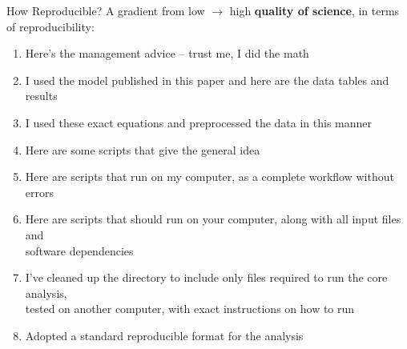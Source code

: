 \documentclass[aspectratio=169]{beamer}
\begin{document}
\begin{frame}{How Reproducible?}\small
  A gradient from low $\rightarrow$ high {\bf quality of science}, in terms of
  reproducibility:\\
  \begin{enumerate}
    \item Here's the management advice -- trust me, I did the math\\[-0.5ex]
    \item I used the model published in this paper and here are the data
    tables and results\\[-0.5ex]
    \item I used these exact equations and preprocessed the data in this
    manner\\[-0.5ex]
    \item Here are some scripts that give the general idea\\[-0.5ex]
    \item Here are scripts that run on my computer, as a complete workflow
    without errors\\[-0.5ex]
    \item Here are scripts that should run on your computer, along with all
    input files and\\
    software dependencies\\[-0.5ex]
    \item I've cleaned up the directory to include only files required to run
    the core analysis,\\
    tested on another computer, with exact instructions on how to run\\[-0.5ex]
    \item Adopted a standard reproducible format for the analysis
  \end{enumerate}
\end{frame}

\end{document}
